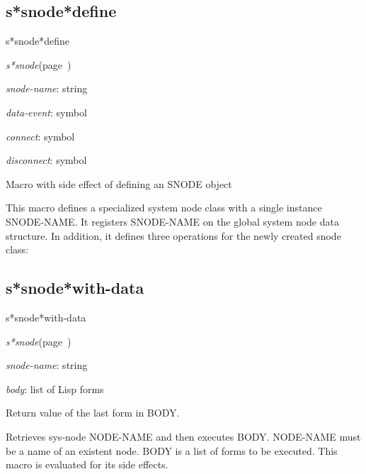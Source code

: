 \subsection{s*snode*define}
\label{s*snode*define}

\begin{description}
\item [Name:]  s*snode*define

\item [Class:]
{\sl s*snode}\hfill(page~\pageref{s*snode})

\item [Parameters:]
\item {\sl snode-name}:  string

\item {\sl data-event}:  symbol

\item {\sl connect}:  symbol

\item {\sl disconnect}:  symbol


\item [Return-value:]
Macro with side effect of defining an SNODE object

\item [Description:]
This macro defines a specialized system node class with a
single instance SNODE-NAME. It registers SNODE-NAME on the
global system node data structure. In addition, it defines
three operations for the newly created snode class:

\item [Public:]



\end{description}
\horizontalline

\subsection{s*snode*with-data}
\label{s*snode*with-data}

\begin{description}
\item [Name:]  s*snode*with-data

\item [Class:]
{\sl s*snode}\hfill(page~\pageref{s*snode})

\item [Parameters:]
\item {\sl snode-name}:  string

\item {\sl body}:  list of Lisp forms


\item [Return-value:] 
Return value of the last form in BODY.

\item [Description:]
Retrieves sys-node NODE-NAME and then executes BODY.
NODE-NAME must be a name of an existent node. 
BODY is a list of forms to be executed.  This macro is
evaluated for its side effects.

\item [Public:]




\end{description}
\horizontalline

